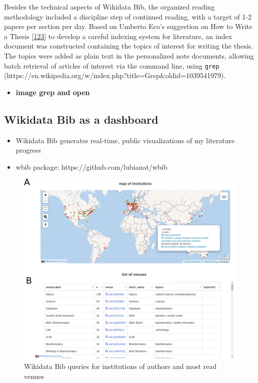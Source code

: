 Besides the technical aspects of Wikidata Bib, the organized reading methodology included a discipline step of continued reading, with a target of 1-2 papers per section per day.
Based on Umberto Eco's suggestion on How to Write a Thesis {[}\protect\hyperlink{ref-1HBVPtZGp}{123}{]} to develop a careful indexing system for literature, an index document was constructed containing the topics of interest for writing the thesis.
The topics were added as plain text in the personalized note documents, allowing batch retrieval of articles of interest via the command line, using \texttt{grep} (https://en.wikipedia.org/w/index.php?title=Grep\&oldid=1039541979).

\begin{itemize}
\tightlist
\item
  \textbf{image grep and open}
\end{itemize}

\hypertarget{wikidata-bib-as-a-dashboard}{%
\subsection{Wikidata Bib as a dashboard}\label{wikidata-bib-as-a-dashboard}}

\begin{itemize}
\item
  Wikidata Bib generates real-time, public visualizations of my literature progress
\item
  wbib package: https://github.com/lubianat/wbib
\end{itemize}

\begin{figure}
\hypertarget{fig:dashboard}{%
\centering
\includegraphics{images/wikidata_bib_display.png}
\caption{Wikidata Bib queries for institutions of authors and most read venues}\label{fig:dashboard}
}
\end{figure}

